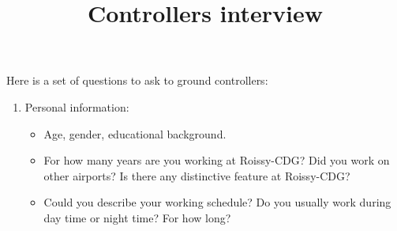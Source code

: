 \documentclass{article}
\begin{document}
		
	\title{Controllers interview}
	\maketitle
Here is a set of questions to ask to ground controllers:

\begin{enumerate}
    \item Personal information:
        \begin{itemize}
            \item Age, gender, educational background.
            \item For how many years are you working at Roissy-CDG? Did you work on other airports? Is there any distinctive feature at Roissy-CDG? 
            \item Could you describe your working schedule? Do you usually work during day time or night time? For how long?
            

\end{itemize}
\end{enumerate}
\end{document}
